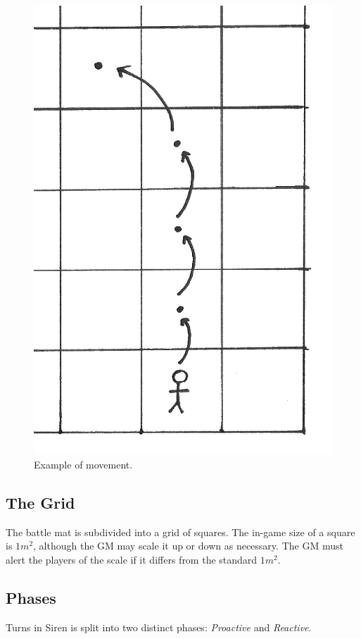 \begin{figure}
    \centering
    \includegraphics{graphics/movement-trans.png}
    \caption{Example of movement.}
    \label{fig:movement}
\end{figure}

\subsection{The Grid}
The battle mat is subdivided into a grid of squares. 
The in-game size of a square is $1m^2$, although the GM may scale it up or down as necessary.
The GM must alert the players of the scale if it differs from the standard $1m^2$.

\newpage
\subsection{Phases}\label{sec:phases}
Turns in Siren is split into two distinct phases: \textit{Proactive} and \textit{Reactive}.

